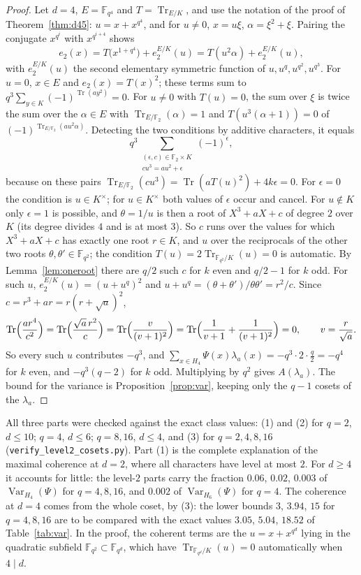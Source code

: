 \documentclass[11pt,a4paper]{amsart}
\theoremstyle{definition}
\theoremstyle{remark}
\newcommand{\F}{\mathbb{F}}
\newcommand{\Tr}{\operatorname{Tr}}
\newcommand{\Var}{\operatorname{Var}}
\begin{document}
\begin{proof}
Let $d=4$, $E=\F_{q^4}$ and $T=\Tr_{E/K}$, and use the notation of the proof of Theorem~\ref{thm:d45}:
$u=x+x^{q^4}$, and for $u\ne0$, $x=u\xi$, $\alpha=\xi^2+\xi$. Pairing the conjugate $x^{q^i}$ with $x^{q^{i+4}}$ shows
\[
e_2(x)=T\bigl(x^{1+q^4}\bigr)+e_2^{E/K}(u)=T(u^2\alpha)+e_2^{E/K}(u),
\]
with $e_2^{E/K}(u)$ the second elementary symmetric function of $u,u^q,u^{q^2},u^{q^3}$. For $u=0$, $x\in E$ and
$e_2(x)=T(x)^2$; these terms sum to $q^3\sum_{y\in K}(-1)^{\Tr(ay^2)}=0$. For $u\ne0$ with $T(u)=0$, the sum over
$\xi$ is twice the sum over the $\alpha\in E$ with $\Tr_{E/\F_2}(\alpha)=1$ and $T(u^3(\alpha+1))=0$ of
$(-1)^{\Tr_{E/\F_2}(au^2\alpha)}$. Detecting the two conditions by additive characters, it equals
\[
q^3\sum_{\substack{(\epsilon,c)\in\F_2\times K\\ cu^3=au^2+\epsilon}}(-1)^{\epsilon},
\]
because on these pairs $\Tr_{E/\F_2}(cu^3)=\Tr(aT(u)^2)+4k\epsilon=0$. For $\epsilon=0$ the condition is $u\in K^\times$;
for $u\in K^\times$ both values of $\epsilon$ occur and cancel. For $u\notin K$ only $\epsilon=1$ is possible, and
$\theta=1/u$ is then a root of $X^3+aX+c$ of degree $2$ over $K$ (its degree divides $4$ and is at most $3$). So $c$
runs over the values for which $X^3+aX+c$ has exactly one root $r\in K$, and $u$ over the reciprocals of the other
two roots $\theta,\theta'\in\F_{q^2}$; the condition $T(u)=2\Tr_{\F_{q^2}/K}(u)=0$ is automatic. By
Lemma~\ref{lem:oneroot} there are $q/2$ such $c$ for $k$ even and $q/2-1$ for $k$ odd. For such $u$,
$e_2^{E/K}(u)=(u+u^q)^2$ and $u+u^q=(\theta+\theta')/\theta\theta'=r^2/c$. Since $c=r^3+ar=r(r+\sqrt a)^2$,
\[
\Tr\Bigl(\frac{ar^4}{c^2}\Bigr)=\Tr\Bigl(\frac{\sqrt a\,r^2}{c}\Bigr)=\Tr\Bigl(\frac{v}{(v+1)^2}\Bigr)
=\Tr\Bigl(\frac1{v+1}+\frac1{(v+1)^2}\Bigr)=0,\qquad v=\frac r{\sqrt a}.
\]
So every such $u$ contributes $-q^3$, and $\sum_{x\in H_4}\Psi(x)\lambda_a(x)=-q^3\cdot2\cdot\frac q2=-q^4$ for $k$
even, and $-q^3(q-2)$ for $k$ odd. Multiplying by $q^2$ gives $A(\lambda_a)$. The bound for the variance is
Proposition~\ref{prop:var}, keeping only the $q-1$ cosets of the $\lambda_a$.
\end{proof}

All three parts were checked against the exact class values: (1) and (2) for $q=2$, $d\le10$; $q=4$, $d\le6$;
$q=8,16$, $d\le4$, and (3) for $q=2,4,8,16$ (\texttt{verify\_level2\_cosets.py}). Part (1) is the complete
explanation of the maximal coherence at $d=2$, where all characters have level at most $2$. For $d\ge4$ it accounts
for little: the level-$2$ parts carry the fraction $0.06$, $0.02$, $0.003$ of $\Var_{H_4}(\Psi)$ for $q=4,8,16$, and
$0.002$ of $\Var_{H_6}(\Psi)$ for $q=4$. The coherence at $d=4$ comes from the whole coset, by (3): the lower bounds
$3$, $3.94$, $15$ for $q=4,8,16$ are to be compared with the exact values $3.05$, $5.04$, $18.52$ of
Table~\ref{tab:var}. In the proof, the coherent terms are the $u=x+x^{q^d}$ lying in the quadratic subfield
$\F_{q^2}\subset\F_{q^d}$, which have $\Tr_{\F_{q^d}/K}(u)=0$ automatically when $4\mid d$.
\end{document}
